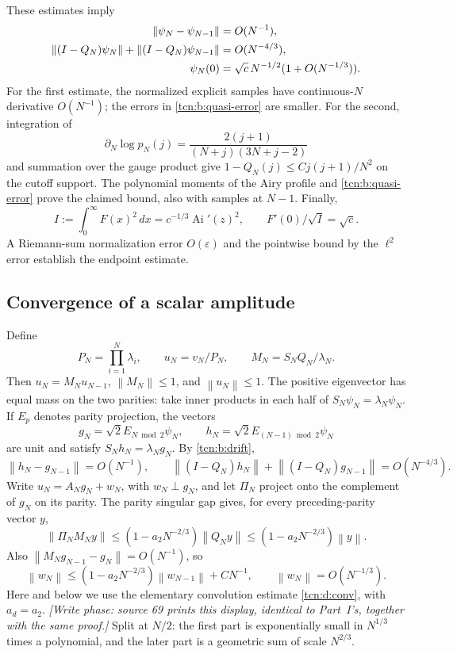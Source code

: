 \documentclass[11pt,letterpaper]{article}
\newcommand{\Ai}{\operatorname{Ai}}
\newcommand{\norm}[1]{\left\lVert#1\right\rVert}
\newcommand{\eps}{\varepsilon}
\theoremstyle{remark}
\begin{document}
These estimates imply
\begin{align}
 \norm{\psi_N-\psi_{N-1}}&=O(N^{-1}),\notag\\
 \norm{(I-Q_N)\psi_N}+\norm{(I-Q_N)\psi_{N-1}}&=O(N^{-4/3}),\notag\\
 \psi_N(0)&=\sqrt c\,N^{-1/2}(1+O(N^{-1/3})).              \label{tcn:b:drift}
\end{align}
For the first estimate, the normalized explicit samples have continuous-$N$ derivative $O(N^{-1})$; the errors in \eqref{tcn:b:quasi-error} are smaller. For the second, integration of
\[
 \partial_N\log p_N(j)=\frac{2(j+1)}{(N+j)(3N+j-2)}
\]
and summation over the gauge product give $1-Q_N(j)\le Cj(j+1)/N^2$ on the cutoff support. The polynomial moments of the Airy profile and \eqref{tcn:b:quasi-error} prove the claimed bound, also with samples at $N-1$. Finally,
\begin{equation}
 I:=\int_0^\infty F(x)^2\,dx=c^{-1/3}\Ai'(z)^2,
 \qquad F'(0)/\sqrt I=\sqrt c.                            \label{tcn:b:airy-norm}
\end{equation}
A Riemann-sum normalization error $O(\eps)$ and the pointwise bound by the $\ell^2$ error establish the endpoint estimate.

\subsection{Convergence of a scalar amplitude}\label{tcn:b:sec:route4}
Define
\[
 P_N=\prod_{i=1}^N\lambda_i,\qquad u_N=v_N/P_N,\qquad
 M_N=S_NQ_N/\lambda_N.
\]
Then $u_N=M_Nu_{N-1}$, $\norm{M_N}\le1$, and $\norm{u_N}\le1$. The positive eigenvector has equal mass on the two parities: take inner products in each half of $S_N\psi_N=\lambda_N\psi_N$. If $E_p$ denotes parity projection, the vectors
\[
 g_N=\sqrt2E_{N\bmod2}\psi_N,\qquad
 h_N=\sqrt2E_{(N-1)\bmod2}\psi_N
\]
are unit and satisfy $S_Nh_N=\lambda_Ng_N$. By \eqref{tcn:b:drift},
\begin{equation}
 \norm{h_N-g_{N-1}}=O(N^{-1}),\qquad
 \norm{(I-Q_N)h_N}+\norm{(I-Q_N)g_{N-1}}=O(N^{-4/3}).       \label{tcn:b:parity-drift}
\end{equation}
Write $u_N=A_Ng_N+w_N$, with $w_N\perp g_N$, and let $\Pi_N$ project onto the complement of $g_N$ on its parity. The parity singular gap gives, for every preceding-parity vector $y$,
\begin{equation}
 \norm{\Pi_NM_Ny}\le(1-a_2N^{-2/3})\norm{Q_Ny}
                  \le(1-a_2N^{-2/3})\norm y.              \label{tcn:b:parity-contraction}
\end{equation}
Also $\norm{M_Ng_{N-1}-g_N}=O(N^{-1})$, so
\[
 \norm{w_N}\le(1-a_2N^{-2/3})\norm{w_{N-1}}+CN^{-1},
 \qquad \norm{w_N}=O(N^{-1/3}).
\]
Here and below we use the elementary convolution estimate \eqref{tcn:d:conv}, with $a_d=a_2$. \emph{[Write phase: source 69 prints this display, identical to Part~I's, together with the same proof.]} Split at $N/2$: the first part is exponentially small in $N^{1/3}$ times a polynomial, and the later part is a geometric sum of scale $N^{2/3}$.
\end{document}
